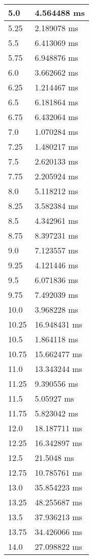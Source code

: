 \begin{multicols}{2}
\begin{tabular}{|l|l|}
		5.0 & 4.564488 ms \\ \hline
		5.25 & 2.189078 ms \\ \hline
		5.5 & 6.413069 ms \\ \hline
		5.75 & 6.948876 ms \\ \hline
		6.0 & 3.662662 ms \\ \hline
		6.25 & 1.214467 ms \\ \hline
		6.5 & 6.181864 ms \\ \hline
		6.75 & 6.432064 ms \\ \hline
		7.0 & 1.070284 ms \\ \hline
		7.25 & 1.480217 ms \\ \hline
		7.5 & 2.620133 ms \\ \hline
		7.75 & 2.205924 ms \\ \hline
		8.0 & 5.118212 ms \\ \hline
		8.25 & 3.582384 ms \\ \hline
		8.5 & 4.342961 ms \\ \hline
		8.75 & 8.397231 ms \\ \hline
		9.0 & 7.123557 ms \\ \hline
		9.25 & 4.121446 ms \\ \hline
		9.5 & 6.071836 ms \\ \hline
		9.75 & 7.492039 ms \\ \hline
		10.0 & 3.968228 ms \\ \hline
		10.25 & 16.948431 ms \\ \hline
		10.5 & 1.864118 ms \\ \hline
		10.75 & 15.662477 ms \\ \hline
		11.0 & 13.343244 ms \\ \hline
		11.25 & 9.390556 ms \\ \hline
		11.5 & 5.05927 ms \\ \hline
		11.75 & 5.823042 ms \\ \hline
		12.0 & 18.187711 ms \\ \hline
		12.25 & 16.342897 ms \\ \hline
		12.5 & 21.5048 ms \\ \hline
		12.75 & 10.785761 ms \\ \hline
		13.0 & 35.854223 ms \\ \hline
		13.25 & 48.255687 ms \\ \hline
		13.5 & 37.936213 ms \\ \hline
		13.75 & 34.426066 ms \\ \hline
		14.0 & 27.098822 ms \\ \hline

\end{tabular}
\end{multicols}
